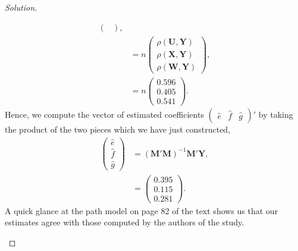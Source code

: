 \documentclass{amsart}
\newcommand{\bvec}[1]{{\boldsymbol #1}}
\begin{document}
\begin{proof}[Solution]
\begin{enumerate}[(a)]
\begin{align*}
\begin{pmatrix}
							\end{pmatrix}, \\
							&= n \begin{pmatrix}
								\rho(\bvec{U}, \bvec{Y}) \\ \rho(\bvec{X}, \bvec{Y}) \\ \rho(\bvec{W}, \bvec{Y})
							\end{pmatrix}, \\
							&= n \begin{pmatrix}
								0.596 \\ 0.405 \\ 0.541
							\end{pmatrix}.
						\end{align*}
						Hence, we compute the vector of estimated coefficients $\begin{pmatrix} \hat{e} & \hat{f} & \hat{g} \end{pmatrix}'$ by taking the product of the two pieces which we have just constructed,
							\begin{align*}
								\begin{pmatrix} \hat{e} \\ \hat{f} \\ \hat{g} \end{pmatrix} &= (\bvec{M}'\bvec{M})^{-1}\bvec{M}'\bvec{Y}, \\
								&= \begin{pmatrix}
									0.395 \\
									0.115 \\
									0.281
								\end{pmatrix}.
							\end{align*}
						A quick glance at the path model on page 82 of the text shows us that our estimates agree with those computed by the authors of the study.


\end{enumerate}
\end{proof}
\end{document}
